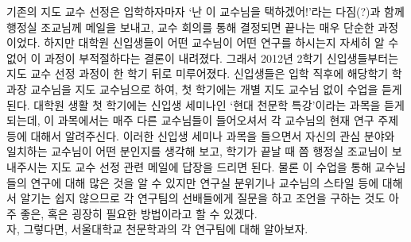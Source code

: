 기존의 지도 교수 선정은 입학하자마자 ‘난 이 교수님을 택하겠어!’라는 다짐(?)과
함께 행정실 조교님께 메일을 보내고, 교수 회의를 통해 결정되면 끝나는 매우 단순한
과정이었다. 하지만 대학원 신입생들이 어떤 교수님이 어떤 연구를 하시는지 자세히 알
수 없어 이 과정이 부적절하다는 결론이 내려졌다. 그래서 2012년 2학기
신입생들부터는 지도 교수 선정 과정이 한 학기 뒤로 미루어졌다. 신입생들은 입학
직후에 해당학기 학과장 교수님을 지도 교수님으로 하여, 첫 학기에는 개별 지도
교수님 없이 수업을 듣게 된다. 대학원 생활 첫 학기에는 신입생 세미나인 ‘현대
천문학 특강’이라는 과목을 듣게 되는데, 이 과목에서는 매주 다른 교수님들이
들어오셔서 각 교수님의 현재 연구 주제 등에 대해서 알려주신다. 이러한 신입생
세미나 과목을 들으면서 자신의 관심 분야와 일치하는 교수님이 어떤 분인지를 생각해
보고, 학기가 끝날 때 쯤 행정실 조교님이 보내주시는 지도 교수 선정 관련 메일에
답장을 드리면 된다. 물론 이 수업을 통해 교수님들의 연구에 대해 많은 것을 알 수
있지만 연구실 분위기나 교수님의 스타일 등에 대해서 알기는 쉽지 않으므로 각
연구팀의 선배들에게 질문을 하고 조언을 구하는 것도 아주 좋은, 혹은 굉장히 필요한
방법이라고 할 수 있겠다. \\

자, 그렇다면, 서울대학교 천문학과의 각 연구팀에 대해 알아보자.

